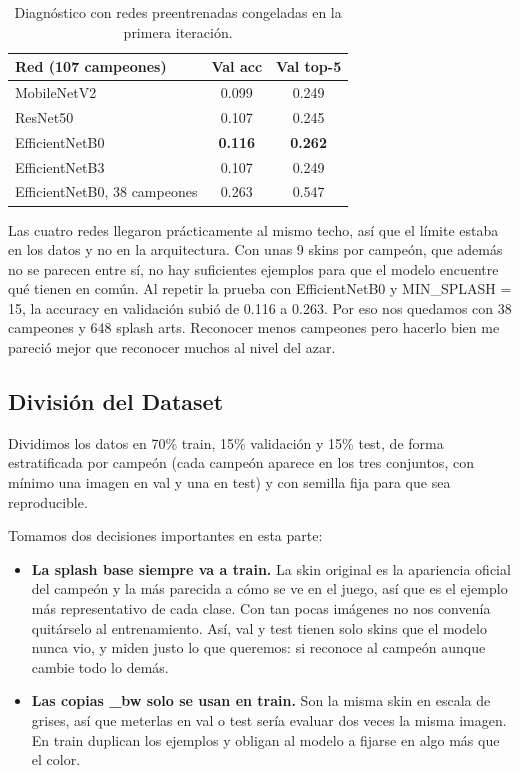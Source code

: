 \documentclass[10pt,twocolumn]{article}
\begin{document}
\begin{table}[h]
  \centering
  \small
  \begin{tabular}{lcc}
    \toprule
    \textbf{Red (107 campeones)} & \textbf{Val acc} & \textbf{Val top-5} \\
    \midrule
    MobileNetV2    & 0.099 & 0.249 \\
    ResNet50       & 0.107 & 0.245 \\
    EfficientNetB0 & \textbf{0.116} & \textbf{0.262} \\
    EfficientNetB3 & 0.107 & 0.249 \\
    \midrule
    EfficientNetB0, 38 campeones & 0.263 & 0.547 \\
    \bottomrule
  \end{tabular}
  \caption{Diagnóstico con redes preentrenadas congeladas en la primera iteración.}
  \label{tab:backbones}
\end{table}

Las cuatro redes llegaron prácticamente al mismo techo, así que el límite estaba en los datos y no en la arquitectura. Con unas 9 skins por campeón, que además no se parecen entre sí, no hay suficientes ejemplos para que el modelo encuentre qué tienen en común. Al repetir la prueba con EfficientNetB0 y MIN\_SPLASH = 15, la accuracy en validación subió de 0.116 a 0.263. Por eso nos quedamos con 38 campeones y 648 splash arts. Reconocer menos campeones pero hacerlo bien me pareció mejor que reconocer muchos al nivel del azar.

\subsection{División del Dataset}

Dividimos los datos en 70\% train, 15\% validación y 15\% test, de forma estratificada por campeón (cada campeón aparece en los tres conjuntos, con mínimo una imagen en val y una en test) y con semilla fija para que sea reproducible.

Tomamos dos decisiones importantes en esta parte:

\begin{itemize}
  \item \textbf{La splash base siempre va a train.} La skin original es la apariencia oficial del campeón y la más parecida a cómo se ve en el juego, así que es el ejemplo más representativo de cada clase. Con tan pocas imágenes no nos convenía quitárselo al entrenamiento. Así, val y test tienen solo skins que el modelo nunca vio, y miden justo lo que queremos: si reconoce al campeón aunque cambie todo lo demás.
  \item \textbf{Las copias \_bw solo se usan en train.} Son la misma skin en escala de grises, así que meterlas en val o test sería evaluar dos veces la misma imagen. En train duplican los ejemplos y obligan al modelo a fijarse en algo más que el color.
\end{itemize}
\end{document}
